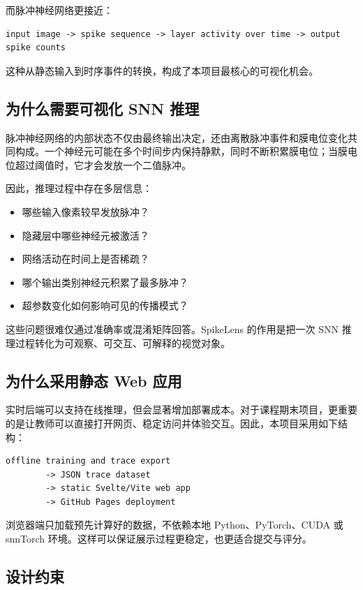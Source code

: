 \documentclass[UTF8,11pt,a4paper]{ctexart}
\newcommand{\projecttitle}{SpikeLens}
\begin{document}
而脉冲神经网络更接近：

\begin{lstlisting}
input image -> spike sequence -> layer activity over time -> output spike counts
\end{lstlisting}

这种从静态输入到时序事件的转换，构成了本项目最核心的可视化机会。

\subsection{为什么需要可视化 SNN 推理}

脉冲神经网络的内部状态不仅由最终输出决定，还由离散脉冲事件和膜电位变化共同构成。一个神经元可能在多个时间步内保持静默，同时不断积累膜电位；当膜电位超过阈值时，它才会发放一个二值脉冲。

因此，推理过程中存在多层信息：

\begin{itemize}
    \item 哪些输入像素较早发放脉冲？
    \item 隐藏层中哪些神经元被激活？
    \item 网络活动在时间上是否稀疏？
    \item 哪个输出类别神经元积累了最多脉冲？
    \item 超参数变化如何影响可见的传播模式？
\end{itemize}

这些问题很难仅通过准确率或混淆矩阵回答。\projecttitle{} 的作用是把一次 SNN 推理过程转化为可观察、可交互、可解释的视觉对象。

\subsection{为什么采用静态 Web 应用}

实时后端可以支持在线推理，但会显著增加部署成本。对于课程期末项目，更重要的是让教师可以直接打开网页、稳定访问并体验交互。因此，本项目采用如下结构：

\begin{lstlisting}
offline training and trace export
        -> JSON trace dataset
        -> static Svelte/Vite web app
        -> GitHub Pages deployment
\end{lstlisting}

浏览器端只加载预先计算好的数据，不依赖本地 Python、PyTorch、CUDA 或 snnTorch 环境。这样可以保证展示过程更稳定，也更适合提交与评分。

\subsection{设计约束}
\end{document}
